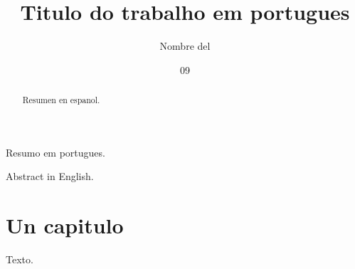 \documentclass[dsc,spanish]{ufrj}
\title{Titulo do trabalho em portugues}
\author{Nombre del}{Autor}
\date{09}{2026}
\begin{document}
  \maketitle
  \frontmatter
  \begin{brazilianabstract}Resumo em portugues.\end{brazilianabstract}
  \begin{foreignabstract}Abstract in English.\end{foreignabstract}
  \begin{abstract}Resumen en espanol.\end{abstract}
  \tableofcontents
  \mainmatter
  \chapter{Un capitulo}
  Texto.
\end{document}
